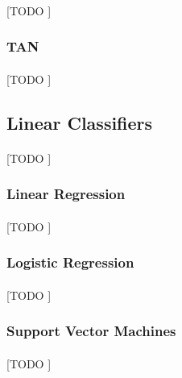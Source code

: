 \documentclass{article}
\begin{document}
				\paragraph{}
				[TODO ]

			\subsubsection{TAN}
			\label{sec:tan-bayes}

				\paragraph{}
				[TODO ]

		\subsection{Linear Classifiers}
		\label{sec:decision-trees}

			\paragraph{}
			[TODO ]

			\subsubsection{Linear Regression}
			\label{sec:linear-regression}

				\paragraph{}
				[TODO ]

			\subsubsection{Logistic Regression}
			\label{sec:logistic-regression}

				\paragraph{}
				[TODO ]

			\subsubsection{Support Vector Machines}
			\label{sec:svm}

				\paragraph{}
				[TODO ]
\end{document}
